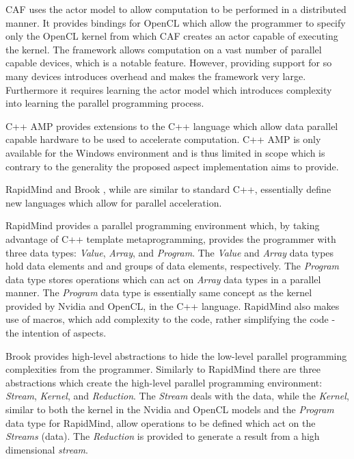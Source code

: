 \documentclass{sig-alternate-05-2015}
\begin{document}
CAF \cite{schmidt:actor} \cite{schmidt:actor1} uses the actor model to allow
computation to be performed in a distributed manner. It provides bindings for
OpenCL which allow the programmer to specify only the OpenCL kernel from which
CAF creates an actor capable of executing the kernel. The framework allows
computation on a vast number of parallel capable devices, which is a notable
feature. However, providing support for so many devices introduces overhead and makes 
the framework very large. Furthermore it requires learning the actor model 
which introduces complexity into learning the parallel programming process.

C++ AMP \cite{microsoft:amp} provides extensions to the C++ language which allow 
data parallel capable hardware to be used to accelerate computation. C++ AMP is 
only available for the Windows environment and is thus limited in scope which is
contrary to the generality the proposed aspect implementation aims to provide.

RapidMind \cite{rapidmind} and Brook \cite{brook}, while are similar to standard
C++, essentially define new languages which allow for parallel acceleration.

RapidMind provides a parallel programming environment which, by
taking advantage of C++ template metaprogramming, provides the programmer 
with three data types: \textit{Value}, \textit{Array}, and \textit{Program}.
The \textit{Value} and \textit{Array} data types hold data elements and and
groups of data elements, respectively. The \textit{Program} data type stores
operations which can act on \textit{Array} data types in a parallel manner.
The \textit{Program} data type is essentially same concept as the kernel provided 
by Nvidia and OpenCL, in the C++ language. RapidMind also makes use of macros,
which add complexity to the code, rather simplifying the code - the intention of
aspects.

Brook provides high-level abstractions to hide the low-level parallel
programming complexities from the programmer. Similarly to RapidMind there 
are three abstractions which create the high-level parallel programming 
environment: \textit{Stream}, \textit{Kernel}, and \textit{Reduction}. The 
\textit{Stream} deals with the data, while the \textit{Kernel}, similar to both 
the kernel in the Nvidia and OpenCL models and the \textit{Program} data type for 
RapidMind, allow operations to be defined which act on the \textit{Streams} (data). 
The \textit{Reduction} is provided to generate a result from a high dimensional 
\textit{stream}.
\end{document}
